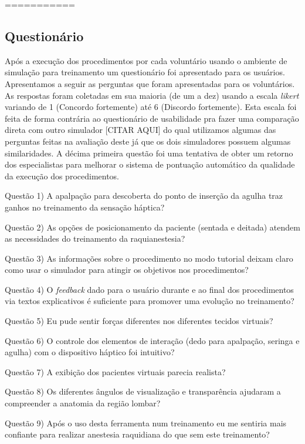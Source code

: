 ===========

\subsection{Questionário}
\label{sec:questionarioEspecialistas}

Após a execução dos procedimentos por cada voluntário usando o ambiente de simulação para treinamento um questionário foi apresentado para os usuários. Apresentamos a seguir as perguntas que foram apresentadas para os voluntários. As respostas foram coletadas em sua maioria (de um a dez) usando a escala \textit{likert} variando de 1 (Concordo fortemente) até 6 (Discordo fortemente). Esta escala foi feita de forma contrária ao questionário de usabilidade pra fazer uma comparação direta com outro simulador [CITAR AQUI] do qual utilizamos algumas das perguntas feitas na avaliação deste já que os dois simuladores possuem algumas similaridades. A décima primeira questão foi uma tentativa de obter um retorno dos especialistas para melhorar o sistema de pontuação automático da qualidade da execução dos procedimentos.

Questão 1) A apalpação para descoberta do ponto de inserção da agulha traz ganhos no treinamento da sensação háptica?

Questão 2) As opções de posicionamento da paciente (sentada e deitada) atendem as necessidades do treinamento da raquianestesia?

Questão 3) As informações sobre o procedimento no modo tutorial deixam claro como usar o simulador para atingir os objetivos nos procedimentos?

Questão 4) O \textit{feedback} dado para o usuário durante e ao final dos procedimentos via textos explicativos é suficiente para promover uma evolução no treinamento?

Questão 5) Eu pude sentir forças diferentes nos diferentes tecidos virtuais?

Questão 6) O controle dos elementos de interação (dedo para apalpação, seringa e agulha) com o dispositivo háptico foi intuitivo?

Questão 7) A exibição dos pacientes virtuais parecia realista?

Questão 8) Os diferentes ângulos de visualização e transparência ajudaram a compreender a anatomia da região lombar?

Questão 9) Após o uso desta ferramenta num treinamento eu me sentiria mais confiante para realizar anestesia raquidiana do que sem este treinamento?

